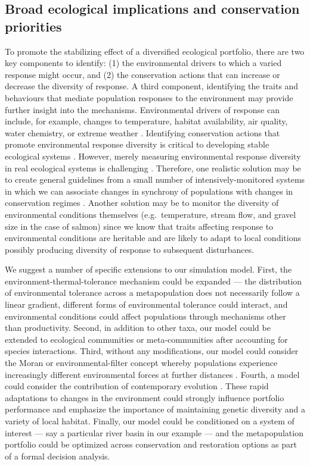 \subsection{Broad ecological implications and conservation priorities}\label{broad-ecological-implications-and-conservation-priorities}

To promote the stabilizing effect of a diversified ecological portfolio, there are two key components to identify: (1) the environmental drivers to which a varied response might occur, and (2) the conservation actions that can increase or decrease the diversity of response. A third component, identifying the traits and behaviours that mediate population responses to the environment may provide further insight into the mechanisms. Environmental drivers of response can include, for example, changes to temperature, habitat availability, air quality, water chemistry, or extreme weather \citep{elmqvist2003}. Identifying conservation actions that promote environmental response diversity is critical to developing stable ecological systems \citep{mori2013}. However, merely measuring environmental response diversity in real ecological systems is challenging \citep[albeit possible;][]{thibaut2012}. Therefore, one realistic solution may be to create general guidelines from a small number of intensively-monitored systems in which we can associate changes in synchrony of populations with changes in conservation regimes \citep[e.g.][]{moore2010, carlson2011}. Another solution may be to monitor the diversity of environmental conditions themselves (e.g.~temperature, stream flow, and gravel size in the case of salmon) since we know that traits affecting response to environmental conditions are heritable and are likely to adapt to local conditions \citep{carlson2011} possibly producing diversity of response to subsequent disturbances.

We suggest a number of specific extensions to our simulation model. First, the environment-thermal-tolerance mechanism could be expanded --- the distribution of environmental tolerance across a metapopulation does not necessarily follow a linear gradient, different forms of environmental tolerance could interact, and environmental conditions could affect populations through mechanisms other than productivity. Second, in addition to other taxa, our model could be extended to ecological communities or meta-communities after accounting for species interactions. Third, without any modifications, our model could consider the Moran or environmental-filter concept whereby populations experience increasingly different environmental forces at further distances \citep{schindler2008, rogers2008}. Fourth, a model could consider the contribution of contemporary evolution \citep{stockwell2003}. These rapid adaptations to changes in the environment could strongly influence portfolio performance and emphasize the importance of maintaining genetic diversity and a variety of local habitat. Finally, our model could be conditioned on a system of interest --- say a particular river basin in our example --- and the metapopulation portfolio could be optimized across conservation and restoration options as part of a formal decision analysis.


